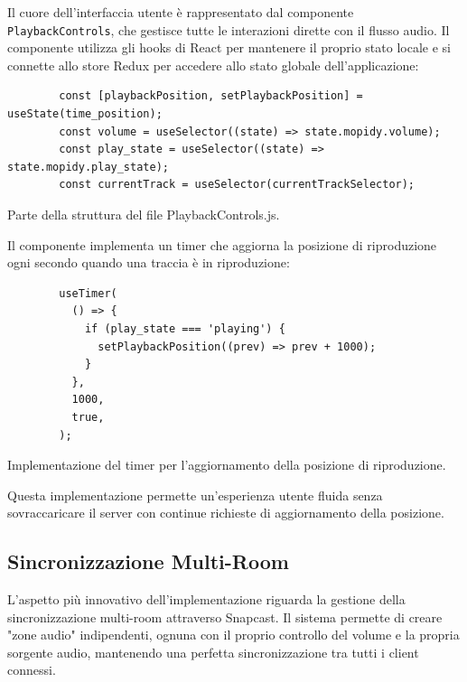 Il cuore dell'interfaccia utente è rappresentato dal componente \texttt{PlaybackControls}, che gestisce tutte le interazioni dirette con il flusso audio. Il componente utilizza gli hooks di React per mantenere il proprio stato locale e si connette allo store Redux per accedere allo stato globale dell'applicazione:

\begin{table}[H]
    \begin{minipage}{0.8\textwidth}
      \begin{verbatim}
        const [playbackPosition, setPlaybackPosition] = useState(time_position);
        const volume = useSelector((state) => state.mopidy.volume);
        const play_state = useSelector((state) => state.mopidy.play_state);
        const currentTrack = useSelector(currentTrackSelector);
      \end{verbatim}
    \end{minipage}
    \caption{Parte della struttura del file PlaybackControls.js.}
    \label{tab:playbackcontrols_js}
  \end{table}

\newpage
Il componente implementa un timer che aggiorna la posizione di riproduzione ogni secondo quando una traccia è in riproduzione:

\begin{table}[H]
    \begin{minipage}{0.5\textwidth}
      \begin{verbatim}
        useTimer(
          () => {
            if (play_state === 'playing') {
              setPlaybackPosition((prev) => prev + 1000);
            }
          },
          1000,
          true,
        );
      \end{verbatim}
    \end{minipage}
    \caption{Implementazione del timer per l'aggiornamento della posizione di riproduzione.}
    \label{tab:timer_implementazione}
\end{table}

Questa implementazione permette un'esperienza utente fluida senza sovraccaricare il server con continue richieste di aggiornamento della posizione.


\subsection{Sincronizzazione Multi-Room}

L'aspetto più innovativo dell'implementazione riguarda la gestione della sincronizzazione multi-room attraverso Snapcast. Il sistema permette di creare "zone audio" indipendenti, ognuna con il proprio controllo del volume e la propria sorgente audio, mantenendo una perfetta sincronizzazione tra tutti i client connessi.

